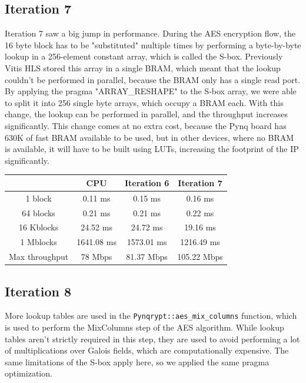 \documentclass[12pt,oneside,a4paper]{article}
\begin{document}
\subsection{Iteration 7} \label{subsec:iter7}
Iteration 7 saw a big jump in performance. 
During the AES encryption flow, the 16 byte block has to be "substituted" multiple times by performing a byte-by-byte lookup in a 256-element constant array, which is called the S-box.
Previously Vitis HLS stored this array in a single BRAM, which meant that the lookup couldn't be performed in parallel, because the BRAM only has a single read port.
By applying the pragma "ARRAY\_RESHAPE" to the S-box array, we were able to split it into 256 single byte arrays, which occupy a BRAM each. With this change, the lookup can be performed in parallel, and the throughput increases significantly.
This change comes at no extra cost, because the Pynq board has 630K of fast BRAM available to be used, but in other devices, where no BRAM is available, it will have to be built using LUTs, increasing the footprint of the IP significantly.

\begin{table}[h!]
	\centering
	\begin{tabular}{cccc}
		\toprule
		 & CPU & Iteration 6 & Iteration 7 \\
		\midrule
		1 block & 0.11 ms & 0.15 ms & 0.16 ms \\
		64 blocks & 0.21 ms & 0.21 ms & 0.22 ms \\
		16 Kblocks & 24.52 ms & 24.72 ms & 19.16 ms \\
		1 Mblocks & 1641.08 ms & 1573.01 ms & 1216.49 ms \\
		Max throughput & 78 Mbps & 81.37 Mbps & 105.22 Mbps \\
		\bottomrule
	\end{tabular}
\end{table}

\subsection{Iteration 8} \label{subsec:iter8}
More lookup tables are used in the {\tt Pynqrypt::aes\_mix\_columns} function, which is used to perform the MixColumns step of the AES algorithm.
While lookup tables aren't strictly required in this step, they are used to avoid performing a lot of multiplications over Galois fields, which are computationally expensive.
The same limitations of the S-box apply here, so we applied the same pragma optimization.
\end{document}
